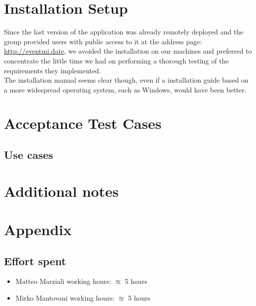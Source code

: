 \documentclass{article}
\begin{document}
\clearpage
\section{Installation Setup}
Since the last version of the application was already remotely deployed and the group provided users with public access to it at the address page: \href{url}{http://eventmi.date}, we avoided the installation on our machines and preferred to concentrate the little time we had on performing a thorough testing of the requirements they implemented.\\ The installation manual seems clear though, even if a installation guide based on a more widespread operating system, such as Windows, would have been better.

\clearpage
\section{Acceptance Test Cases}



\clearpage
\subsection{Use cases}


\clearpage
\section{Additional notes}



\clearpage
\section{Appendix}

\subsection{Effort spent}
\begin{itemize}

\item Matteo Marziali working hours:  $\approxeq$ 5 hours

\item Mirko Mantovani working hours:  $\approxeq$ 5 hours



\end{itemize}
\end{document}
